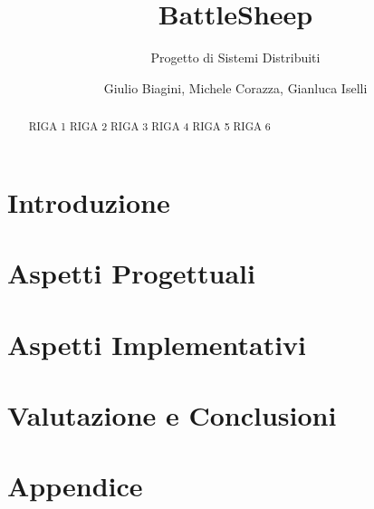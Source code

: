 \documentclass[a4paper,10pt]{scrartcl}
\begin{document}
\title{BattleSheep}
\subtitle{Progetto di Sistemi Distribuiti}
\author{Giulio Biagini, Michele Corazza, Gianluca Iselli}
\maketitle

\begin{abstract}
RIGA 1\newline
RIGA 2\newline
RIGA 3\newline
RIGA 4\newline
RIGA 5\newline
RIGA 6
\end{abstract}

\section{Introduzione}


\section{Aspetti Progettuali}




\section{Aspetti Implementativi}
%
%



\section{Valutazione e Conclusioni}


\newpage

\section{Appendice}
\end{document}
